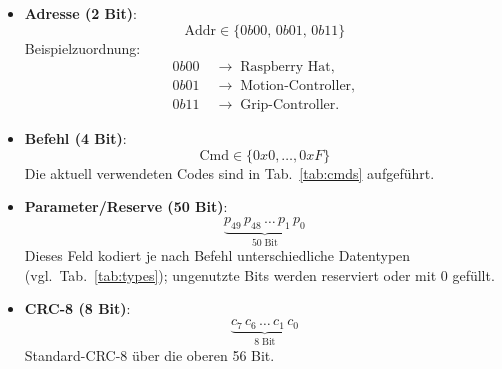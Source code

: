 \documentclass[main.tex]{subfiles} %
\begin{document}
\begin{itemize}
  \item \textbf{Adresse (2 Bit)}:
    \[
      \text{Addr} \in \{0b00,\,0b01,\,0b11\}
    \]
    Beispielzuordnung:
    \begin{align*}
      0b00 &\;\rightarrow\; \text{Raspberry Hat},\\
      0b01 &\;\rightarrow\; \text{Motion-Controller},\\
      0b11 &\;\rightarrow\; \text{Grip-Controller}.
    \end{align*}

  \item \textbf{Befehl (4 Bit)}:
    \[
      \text{Cmd} \in \{0x0,\dots,0xF\}
    \]
    Die aktuell verwendeten Codes sind in Tab.~\ref{tab:cmds} aufgeführt.

  \item \textbf{Parameter/Reserve (50 Bit)}:
    \[
      \underbrace{p_{49}\,p_{48}\,\dots\,p_{1}\,p_{0}}_{50\;\text{Bit}}
    \]
    Dieses Feld kodiert je nach Befehl unterschiedliche Datentypen
    (vgl.\ Tab.~\ref{tab:types}); ungenutzte Bits werden reserviert
    oder mit 0 gefüllt.

  \item \textbf{CRC-8 (8 Bit)}:
    \[
      \underbrace{c_{7}\,c_{6}\,\dots\,c_{1}\,c_{0}}_{8\;\text{Bit}}
    \]
    Standard-CRC-8 über die oberen 56 Bit.
\end{itemize}

\newpage
\end{document}
